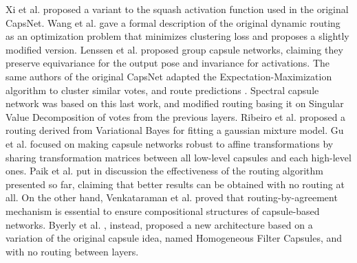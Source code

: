\documentclass{article}
\begin{document}
Xi et al. \cite{xi2017capsule} proposed a variant to the squash activation function used in the original CapsNet. Wang et al. \cite{wang2018optimization} gave a formal description of the original dynamic routing as an optimization problem that minimizes clustering loss and proposes a slightly modified version. Lenssen et al. \cite{lenssen2018group} proposed group capsule networks, claiming they preserve equivariance for the output pose and invariance for activations. The same authors of the original CapsNet adapted the Expectation-Maximization algorithm to cluster similar votes, and route predictions \cite{hinton2018matrix}. Spectral capsule network \cite{bahadori2018spectral} was based on this last work, and modified routing basing it on Singular Value Decomposition of votes from the previous layers. Ribeiro et al. \cite{ribeiro2020capsule} proposed a routing derived from Variational Bayes for fitting a gaussian mixture model. Gu et al. \cite{gu2020improving} focused on making capsule networks 
robust to affine transformations by sharing transformation matrices between all low-level capsules and each high-level ones. Paik et al. \cite{paik2019capsule} put in discussion the effectiveness of the routing algorithm presented so far, claiming that better results can be obtained with no routing at all. On the other hand, Venkataraman et al. \cite{venkatraman2020learning} proved that routing-by-agreement mechanism is essential to ensure compositional structures of capsule-based networks. Byerly et al. \cite{byerly2020branching}, instead, proposed a new architecture based on a variation of the original capsule idea, named Homogeneous Filter Capsules, and with no routing between layers.
\end{document}
